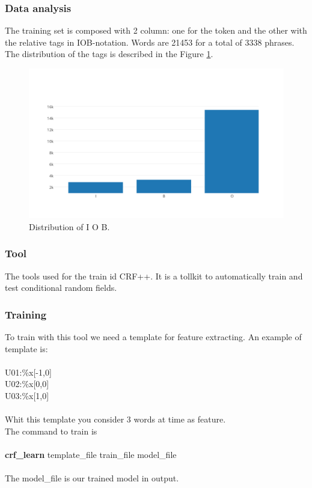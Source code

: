 \documentclass[a4paper,8pt,oneside]{article}
\begin{document}
		\subsubsection{Data analysis}
			The training set is composed with 2 column: one for the token and the other with the relative tags in IOB-notation. Words are 21453 for a total of 3338 phrases. The distribution of the tags is described in the Figure \ref{crf-dist}.
			\begin{figure}[h!]
			  \centering
			    \includegraphics[width=1.0\textwidth]{img/crf-dist}
			  \caption{Distribution of I O B.}
			  \label{crf-dist}
			\end{figure}
		\subsubsection{Tool}
			The tools used for the train id CRF++. It is a tollkit to automatically train and test conditional random fields.
		\subsubsection{Training}
			To train with this tool we need a template for feature extracting.
			An example of template is: \\ \\
			U01:\%x[-1,0] \\
			U02:\%x[0,0] \\
			U03:\%x[1,0] \\ \\
			Whit this template you consider 3 words at time as feature. \\
			The command to train is \\\\
			\textbf{crf\_learn} template\_file train\_file model\_file\\\\
			The model\_file is our trained model in output.
\end{document}
